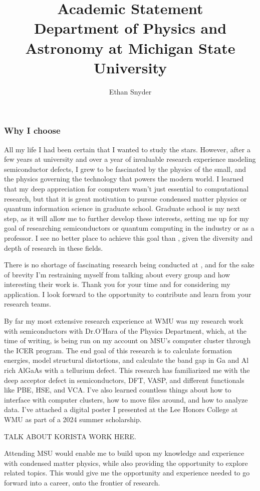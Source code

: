 \documentclass[11pt]{article}
\title{Academic Statement\\
\large Department of Physics and Astronomy at Michigan State University}
\author{Ethan Snyder}
\begin{document}
\maketitle
\subsubsection*{Why I choose \schoolabbr}
All my life I had been certain that I wanted to study the stars. However, after a few years at university and over a year of invaluable research experience modeling semiconductor defects, I grew to be fascinated by the physics of the small, and the physics governing the technology that powers the modern world. I learned that my deep appreciation for computers wasn't just essential to computational research, but that it is great motivation to pursue condensed matter physics or quantum information science in graduate school. Graduate school is my next step, as it will allow me to further develop these interests, setting me up for my goal of researching semiconductors or quantum computing in the industry or as a professor. I see no better place to achieve this goal than \school{}, given the diversity and depth of research in these fields.

There is no shortage of fascinating research being conducted at \schoolabbr{}, and for the sake of brevity I'm restraining myself from talking about every group and how interesting their work is. Thank you for your time and for considering my application. I look forward to the opportunity to contribute and learn from your research teams.

By far my most extensive research experience at WMU was my research work with semiconductors with Dr.\@ O'Hara of the Physics Department, which, at the time of writing, is being run on my account on MSU's computer cluster through the ICER program. The end goal of this research is to calculate formation energies, model structural distortions, and calculate the band gap in Ga and Al rich AlGaAs with a tellurium defect. This research has familiarized me with the deep acceptor defect in semiconductors, DFT, VASP, and different functionals like PBE, HSE, and VCA. I've also learned countless things about how to interface with computer clusters, how to move files around, and how to analyze data. I've attached a digital poster I presented at the Lee Honors College at WMU as part of a 2024 summer scholarship.

TALK ABOUT KORISTA WORK HERE.

Attending MSU would enable me to build upon my knowledge and experience with condensed matter physics, while also providing the opportunity to explore related topics. This would give me the opportunity and experience needed to go forward into a career, onto the frontier of research.
\end{document}

